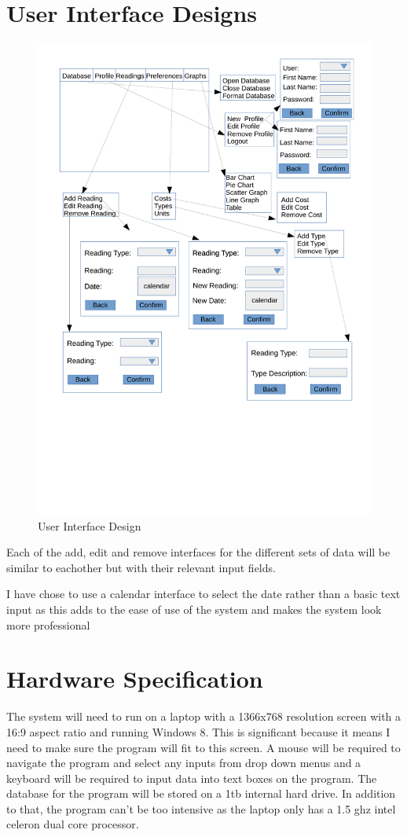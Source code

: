 \section{User Interface Designs}
\begin{landscape}
\begin{figure}[H]
\includegraphics{./design/User Interface Design.pdf}
\caption{User Interface Design}
\end{figure}
\end{landscape}
Each of the add, edit and remove interfaces for the different sets of data will be similar to eachother but with their relevant input fields.

I have chose to use a calendar interface to select the date rather than a basic text input as this adds to the ease of use of the system and makes the system look more professional

\section{Hardware Specification}
The system will need to run on a laptop with a 1366x768 resolution screen with a 16:9  aspect ratio and running Windows 8. This is significant because it means I need to make sure the program will fit to this screen. A mouse will be required to navigate the program and select any inputs from drop down menus and a keyboard will be required to input data into text boxes on the program. The database for the program will be stored on a 1tb internal hard drive. In addition to that, the program can't be too intensive as the laptop only has a 1.5 ghz intel celeron dual core processor.
